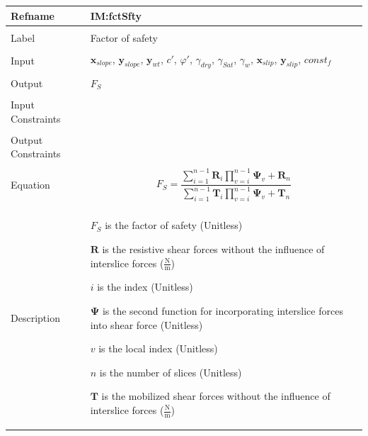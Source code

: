 \documentclass[12pt]{article}
\begin{document}
\noindent \begin{minipage}{\textwidth}
\begin{tabular}{p{} p{}}
\toprule \textbf{Refname} & \textbf{IM:fctSfty}
\label{IM:fctSfty}
\\ \midrule \\
Label & Factor of safety
\\ \midrule \\
Input & ${\mathbf{x}_{slope}}$, ${\mathbf{y}_{slope}}$, ${\mathbf{y}_{wt}}$, $c'$, $φ'$, ${γ_{dry}}$, ${γ_{Sat}}$, ${γ_{w}}$, ${\mathbf{x}_{slip}}$, ${\mathbf{y}_{slip}}$, $const_f$
\\ \midrule \\
Output & ${F_{S}}$
\\ \midrule \\
Input Constraints & 
\\ \midrule \\
Output Constraints & 
\\ \midrule \\
Equation & \begin{displaymath}
           {F_{S}}=\frac{\displaystyle\sum_{i=1}^{n-1}{{\mathbf{R}}_{i} \displaystyle\prod_{v=i}^{n-1}{{\mathbf{Ψ}}_{v}}}+{\mathbf{R}}_{n}}{\displaystyle\sum_{i=1}^{n-1}{{\mathbf{T}}_{i} \displaystyle\prod_{v=i}^{n-1}{{\mathbf{Ψ}}_{v}}}+{\mathbf{T}}_{n}}
           \end{displaymath}
\\ \midrule \\
Description & \begin{symbDescription}
              \item{${F_{S}}$ is the factor of safety (Unitless)}
              \item{$\mathbf{R}$ is the resistive shear forces without the influence of interslice forces ($\frac{\text{N}}{\text{m}}$)}
              \item{$i$ is the index (Unitless)}
              \item{$\mathbf{Ψ}$ is the second function for incorporating interslice forces into shear force (Unitless)}
              \item{$v$ is the local index (Unitless)}
              \item{$n$ is the number of slices (Unitless)}
              \item{$\mathbf{T}$ is the mobilized shear forces without the influence of interslice forces ($\frac{\text{N}}{\text{m}}$)}
              \end{symbDescription}

\end{tabular}
\end{minipage}
\end{document}
